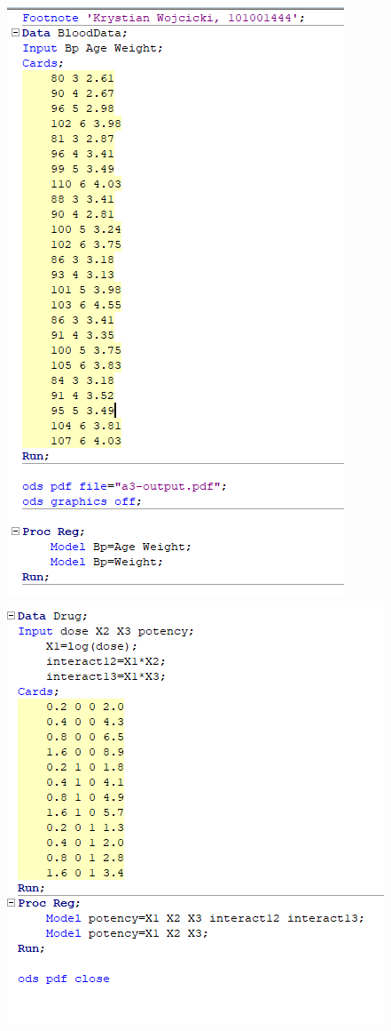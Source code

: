 \documentclass{article}
\begin{document}
\includegraphics{a3_sascode1} \\
\includegraphics{a3_sascode2}
\end{document}
